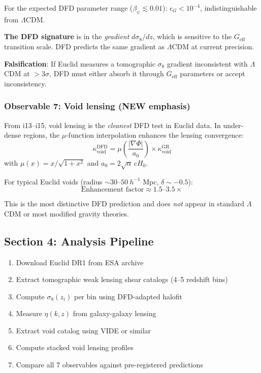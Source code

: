 \documentclass[11pt,a4paper]{article}
\begin{document}
For the expected DFD parameter range ($\beta_\psi \lesssim 0.01$): $\epsilon_G < 10^{-4}$, indistinguishable from $\Lambda$CDM.

\textbf{The DFD signature} is in the \emph{gradient} $d\sigma_8/dz$, which is sensitive to the $G_{\mathrm{eff}}$ transition scale. DFD predicts the same gradient as $\Lambda$CDM at current precision.

\textbf{Falsification}: If Euclid measures a tomographic $\sigma_8$ gradient inconsistent with $\Lambda$CDM at $> 3\sigma$, DFD must either absorb it through $G_{\mathrm{eff}}$ parameters or accept inconsistency.

\subsubsection{Observable 7: Void lensing (NEW emphasis)}

From i13--i15, void lensing is the \emph{cleanest} DFD test in Euclid data. In under-dense regions, the $\mu$-function interpolation enhances the lensing convergence:
\begin{equation}
\kappa_{\mathrm{void}}^{\mathrm{DFD}} = \mu\!\left(\frac{|\nabla\Phi|}{a_0}\right) \times \kappa_{\mathrm{void}}^{\mathrm{GR}}
\end{equation}
with $\mu(x) = x/\sqrt{1+x^2}$ and $a_0 = 2\sqrt{\alpha}\,c H_0$.

For typical Euclid voids (radius $\sim 30$--$50~h^{-1}$ Mpc, $\delta \sim -0.5$):
\begin{equation}
\text{Enhancement factor} \approx 1.5\text{--}3.5\times
\end{equation}

This is the most distinctive DFD prediction and does \emph{not} appear in standard $\Lambda$CDM or most modified gravity theories.

\subsection{Section 4: Analysis Pipeline}

\begin{enumerate}
\item Download Euclid DR1 from ESA archive
\item Extract tomographic weak lensing shear catalogs (4--5 redshift bins)
\item Compute $\sigma_8(z_i)$ per bin using DFD-adapted halofit
\item Measure $\eta(k,z)$ from galaxy-galaxy lensing
\item Extract void catalog using VIDE or similar
\item Compute stacked void lensing profiles
\item Compare all 7 observables against pre-registered predictions
\end{enumerate}
\end{document}
